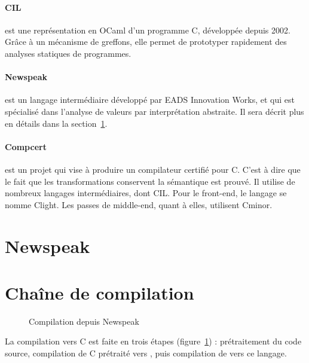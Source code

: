\paragraph{CIL}\cite{NeculaCil}  est une représentation en
OCaml d'un programme C, développée depuis 2002. Grâce à un mécanisme de
greffons, elle permet de prototyper rapidement des analyses statiques de
programmes.

\paragraph{Newspeak}\cite{newspeak} est un langage intermédiaire développé par
EADS Innovation Works, et qui est spécialisé dans l'analyse de valeurs par
interprétation abstraite. Il sera décrit plus en détails dans la
section~\ref{sec:npk}.

\paragraph{Compcert} est un projet qui vise à produire un compilateur certifié
pour C. C'est à dire que le fait que les transformations conservent la
sémantique est prouvé. Il utilise de nombreux langages intermédiaires, dont CIL.
Pour le front-end, le langage se nomme Clight\cite{cfront}. Les passes de
middle-end, quant à elles, utilisent Cminor\cite{cminorSL}.

%

\section{Newspeak}
\label{sec:npk}

\wip{}

\section{Chaîne de compilation}

\begin{figure}
  \centering
  
  \caption{Compilation depuis Newspeak}
  \label{fig:compil-npk}
\end{figure}


La compilation vers C est faite en trois étapes (figure~\ref{fig:compil-npk}) :
prétraitement du code source, compilation de C prétraité vers \newspeak{}, puis
compilation de \newspeak{} vers ce langage.

